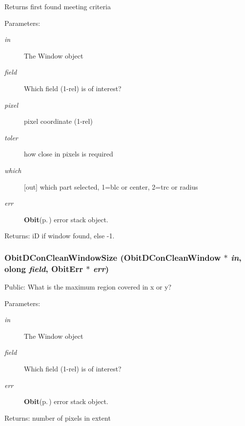 Returns first found meeting criteria \begin{Desc}
\item[Parameters:]
\begin{description}
\item[{\em in}]The Window object \item[{\em field}]Which field (1-rel) is of interest? \item[{\em pixel}]pixel coordinate (1-rel) \item[{\em toler}]how close in pixels is required \item[{\em which}][out] which part selected, 1=blc or center, 2=trc or radius \item[{\em err}]{\bf Obit}{\rm (p.\,\pageref{structObit})} error stack object. \end{description}
\end{Desc}
\begin{Desc}
\item[Returns:]i\-D if window found, else -1. \end{Desc}
\subsubsection{ Obit\-DCon\-Clean\-Window\-Size ({\bf Obit\-DCon\-Clean\-Window} $\ast$ {\em in}, {\bf olong} {\em field}, {\bf Obit\-Err} $\ast$ {\em err})}\label{ObitDConCleanWindow_8c_a28}


Public: What is the maximum region covered in x or y? 

\begin{Desc}
\item[Parameters:]
\begin{description}
\item[{\em in}]The Window object \item[{\em field}]Which field (1-rel) is of interest? \item[{\em err}]{\bf Obit}{\rm (p.\,\pageref{structObit})} error stack object. \end{description}
\end{Desc}
\begin{Desc}
\item[Returns:]number of pixels in extent \end{Desc}
